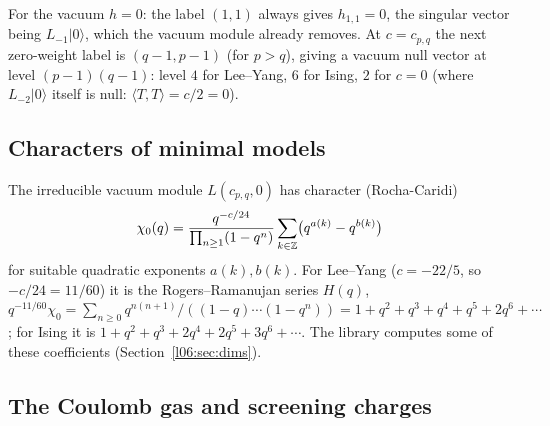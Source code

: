 For the vacuum $h = 0$: the label $(1,1)$ always gives $h_{1,1} = 0$, the singular vector being
$L_{-1}|0\rangle$, which the vacuum module already removes. At $c = c_{p,q}$ the next zero-weight label
is $(q-1,p-1)$ (for $p>q$), giving a vacuum null vector at level $(p-1)(q-1)$: level $4$ for
Lee--Yang, $6$ for Ising, $2$ for $c = 0$ (where $L_{-2}|0\rangle$ itself is null: $\langle T,T\rangle = c/2 = 0$).

\subsection{Characters of minimal models}

The irreducible vacuum module $L(c_{p,q},0)$ has character (Rocha-Caridi)
\begin{equation*}
 \chi_{0}(q) = \frac{q^{-c/24}}{\prod_{n\ge1}(1-q^n)}\sum_{k\in{\mathbb{Z}}}\bigl(q^{a(k)}-q^{b(k)}\bigr)
\end{equation*}
for suitable quadratic exponents $a(k),b(k)$. For Lee--Yang ($c=-22/5$, so $-c/24 = 11/60$) it is the Rogers--Ramanujan series $H(q)$,
$q^{-11/60}\chi_0 = \sum_{n\ge0}q^{n(n+1)}/((1-q)\cdots(1-q^n)) = 1+q^2+q^3+q^4+q^5+2q^6+\cdots$;
for Ising it is $1+q^2+q^3+2q^4+2q^5+3q^6+\cdots$. The library computes some of these coefficients
(Section~\ref{l06:sec:dims}).

\subsection{The Coulomb gas and screening charges}

